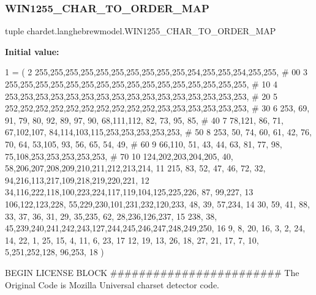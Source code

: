 \mbox{\label{namespacechardet_1_1langhebrewmodel_a22e0ac1d842eded550c3a760233aa627}} 
\subsubsection{\texorpdfstring{W\+I\+N1255\+\_\+\+C\+H\+A\+R\+\_\+\+T\+O\+\_\+\+O\+R\+D\+E\+R\+\_\+\+M\+AP}{WIN1255\_CHAR\_TO\_ORDER\_MAP}}
{\footnotesize\ttfamily tuple chardet.\+langhebrewmodel.\+W\+I\+N1255\+\_\+\+C\+H\+A\+R\+\_\+\+T\+O\+\_\+\+O\+R\+D\+E\+R\+\_\+\+M\+AP}

{\bfseries Initial value\+:}
\begin{DoxyCode}
1 =  (
2 255,255,255,255,255,255,255,255,255,255,254,255,255,254,255,255,  \textcolor{comment}{# 00}
3 255,255,255,255,255,255,255,255,255,255,255,255,255,255,255,255,  \textcolor{comment}{# 10}
4 253,253,253,253,253,253,253,253,253,253,253,253,253,253,253,253,  \textcolor{comment}{# 20}
5 252,252,252,252,252,252,252,252,252,252,253,253,253,253,253,253,  \textcolor{comment}{# 30}
6 253, 69, 91, 79, 80, 92, 89, 97, 90, 68,111,112, 82, 73, 95, 85,  \textcolor{comment}{# 40}
7  78,121, 86, 71, 67,102,107, 84,114,103,115,253,253,253,253,253,  \textcolor{comment}{# 50}
8 253, 50, 74, 60, 61, 42, 76, 70, 64, 53,105, 93, 56, 65, 54, 49,  \textcolor{comment}{# 60}
9  66,110, 51, 43, 44, 63, 81, 77, 98, 75,108,253,253,253,253,253,  \textcolor{comment}{# 70}
10 124,202,203,204,205, 40, 58,206,207,208,209,210,211,212,213,214,
11 215, 83, 52, 47, 46, 72, 32, 94,216,113,217,109,218,219,220,221,
12  34,116,222,118,100,223,224,117,119,104,125,225,226, 87, 99,227,
13 106,122,123,228, 55,229,230,101,231,232,120,233, 48, 39, 57,234,
14  30, 59, 41, 88, 33, 37, 36, 31, 29, 35,235, 62, 28,236,126,237,
15 238, 38, 45,239,240,241,242,243,127,244,245,246,247,248,249,250,
16   9,  8, 20, 16,  3,  2, 24, 14, 22,  1, 25, 15,  4, 11,  6, 23,
17  12, 19, 13, 26, 18, 27, 21, 17,  7, 10,  5,251,252,128, 96,253,
18 )
\end{DoxyCode}


B\+E\+G\+IN L\+I\+C\+E\+N\+SE B\+L\+O\+CK \#\#\#\#\#\#\#\#\#\#\#\#\#\#\#\#\#\#\#\#\#\#\#\# The Original Code is Mozilla Universal charset detector code. 

